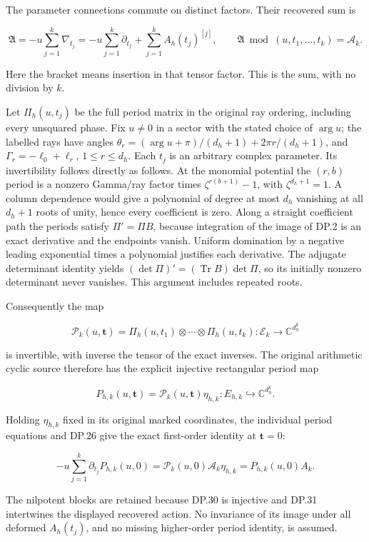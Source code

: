 The parameter connections commute on distinct factors. Their recovered sum is

\[
\mathfrak A=-u\sum_{j=1}^k\nabla_{t_j}
=-u\sum_{j=1}^k\partial_{t_j}
 +\sum_{j=1}^k A_h(t_j)^{[j]},
\qquad
\mathfrak A\bmod(u,t_1,\ldots,t_k)=\mathcal A_k.
\tag{DP.28}
\]

Here the bracket means insertion in that tensor factor. This is the sum, with no division by \(k\).

Let \(\Pi_h(u,t_j)\) be the full period matrix in the original ray ordering, including every unsquared phase. Fix \(u\ne0\) in a sector with the stated choice of \(\arg u\); the labelled rays have angles \(\theta_r=(\arg u+\pi)/(d_h+1)+2\pi r/(d_h+1)\), and \(\Gamma_r=-\ell_0+\ell_r\), \(1\le r\le d_h\). Each \(t_j\) is an arbitrary complex parameter. Its invertibility follows directly as follows. At the monomial potential the \((r,b)\) period is a nonzero Gamma/ray factor times \(\zeta^{r(b+1)}-1\), with \(\zeta^{d_h+1}=1\). A column dependence would give a polynomial of degree at most \(d_h\) vanishing at all \(d_h+1\) roots of unity, hence every coefficient is zero. Along a straight coefficient path the periods satisfy \(\Pi'=\Pi B\), because integration of the image of DP.2 is an exact derivative and the endpoints vanish. Uniform domination by a negative leading exponential times a polynomial justifies each derivative. The adjugate determinant identity yields \((\det\Pi)'=(\operatorname{Tr}B)\det\Pi\), so its initially nonzero determinant never vanishes. This argument includes repeated roots.

Consequently the map

\[
\mathscr P_k(u,\mathbf t)
=\Pi_h(u,t_1)\otimes\cdots\otimes\Pi_h(u,t_k)
:\mathcal E_k\longrightarrow\mathbb C^{d_h^k}
\tag{DP.29}
\]

is invertible, with inverse the tensor of the exact inverses. The original arithmetic cyclic source therefore has the explicit injective rectangular period map

\[
P_{h,k}(u,\mathbf t)=\mathscr P_k(u,\mathbf t)\eta_{h,k}
:E_{h,k}\hookrightarrow\mathbb C^{d_h^k}.
\tag{DP.30}
\]

Holding \(\eta_{h,k}\) fixed in its original marked coordinates, the individual period equations and DP.26 give the exact first-order identity at \(\mathbf t=0\):

\[
-u\sum_{j=1}^k\partial_{t_j}P_{h,k}(u,0)
=\mathscr P_k(u,0)\mathcal A_k\eta_{h,k}
=P_{h,k}(u,0)A_k.
\tag{DP.31}
\]

The nilpotent blocks are retained because DP.30 is injective and DP.31 intertwines the displayed recovered action. No invariance of its image under all deformed \(A_h(t_j)\), and no missing higher-order period identity, is assumed.

